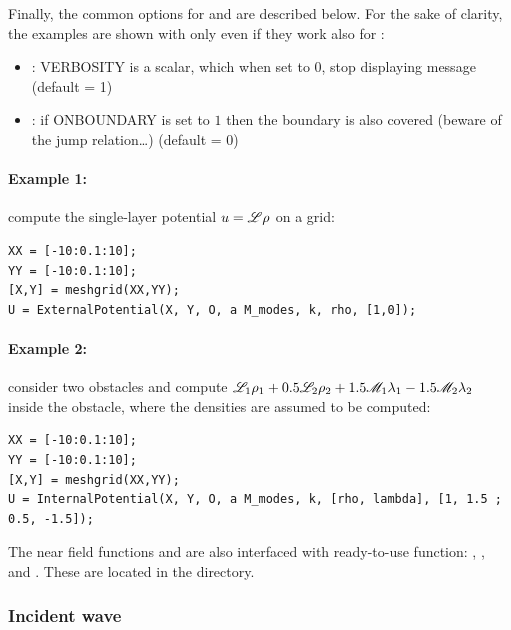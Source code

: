 Finally, the common options for  and  are described below. For the sake of clarity, the examples are shown with only  even if they work also for :
\begin{itemize}
\item {} : VERBOSITY is a scalar, which when set to 0, stop displaying message (default = 1)
\item {} : if ONBOUNDARY is set to $1$ then the boundary is also covered (beware of the jump relation\ldots) (default = 0)
\end{itemize}

\paragraph{Example 1: }compute the single-layer potential $u={\mathscr L}\rho$ on a grid:
\begin{lstlisting}
XX = [-10:0.1:10];
YY = [-10:0.1:10];
[X,Y] = meshgrid(XX,YY);
U = ExternalPotential(X, Y, O, a M_modes, k, rho, [1,0]);
\end{lstlisting}

\paragraph{Example 2: } consider two obstacles and compute ${\mathscr L}_1\rho_1 + 0.5{\mathscr L}_2\rho_2 + 1.5{\mathscr M}_1\lambda_1 -1.5{\mathscr M}_2\lambda_2$  inside the obstacle, where the densities are assumed to be computed:
\begin{lstlisting}
XX = [-10:0.1:10];
YY = [-10:0.1:10];
[X,Y] = meshgrid(XX,YY);
U = InternalPotential(X, Y, O, a M_modes, k, [rho, lambda], [1, 1.5 ; 0.5, -1.5]);
\end{lstlisting}

\begin{remark}
The near field functions  and  are also interfaced with ready-to-use function: , ,  and . These are located in the  directory.
\end{remark}

\subsubsection{Incident wave}

